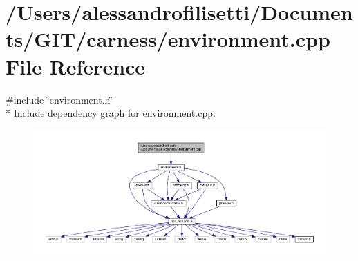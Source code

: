 \hypertarget{a00085}{\section{/\-Users/alessandrofilisetti/\-Documents/\-G\-I\-T/carness/environment.cpp File Reference}
\label{a00085}
}
{\ttfamily \#include \char`\"{}environment.\-h\char`\"{}}\\*
Include dependency graph for environment.\-cpp\-:\nopagebreak
\begin{figure}[H]
\begin{center}
\leavevmode
\includegraphics[width=350pt]{a00132}
\end{center}
\end{figure}
